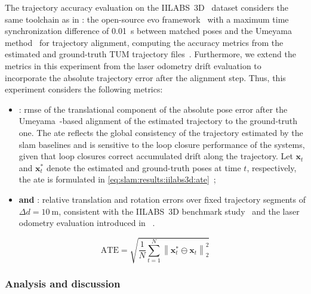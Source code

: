 The trajectory accuracy evaluation on the IILABS~3D~\cite{ribeiro:access:2025}
dataset considers the same toolchain as in
:
the open-source evo framework~\cite{grupp:evo} with a maximum time
synchronization difference of \SI{0.01}{\second} between matched poses and
the Umeyama method~\cite{umeyama:tpami:1991} for trajectory alignment,
computing the accuracy metrics from the estimated and ground-truth
TUM trajectory files~\cite{sturm:iros:2012}.
Furthermore, we extend the metrics in this experiment from the laser odometry
drift evaluation to incorporate the absolute trajectory error after the
alignment step. Thus, this experiment considers the following metrics:
\begin{itemize}
\item \textbf{}:
      \gls{rmse} of the translational component of the absolute
      pose error after the Umeyama~\cite{umeyama:tpami:1991}-based alignment
      of the estimated trajectory to the ground-truth one.
      The \gls{ate} reflects the global consistency of the trajectory estimated
      by the \gls{slam} baselines and is sensitive to the loop closure
      performance of the systems, given that loop closures correct accumulated
      drift along the trajectory.
      Let $\mathbf{x}_t$ and $\mathbf{x}_t^*$ denote the estimated and
      ground-truth poses at time $t$, respectively, the \gls{ate} is
      formulated in \eqref{eq:slam:results:iilabs3d:ate}~\cite{geiger:cvpr:2012};

\item \textbf{ and
      }:
      relative translation and rotation errors over fixed trajectory segments of
      $\Delta d = \SI{10}{\metre}$, consistent with the IILABS~3D benchmark
      study~\cite{ribeiro:access:2025} and the laser odometry evaluation
      introduced in ~\cite{geiger:cvpr:2012}.
\end{itemize}
\begin{equation}
\label{eq:slam:results:iilabs3d:ate}
\mathrm{ATE} =
\sqrt{\frac{1}{N}\sum_{t=1}^{N}
      \left\|\mathbf{x}_t^* \ominus \mathbf{x}_t\right\|_2^2}
\end{equation}

\subsubsection{Analysis and discussion}
\label{sec:slam:results:iilabs3d:analysis}


